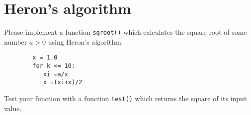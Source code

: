 \section{Heron's algorithm}
Please implement a function \verb|sqroot()| which calculates the square root of some number $a > 0$ using Heron's algorithm:
	\begin{verbatim}
		x = 1.0
		for k <= 10:
		   xi =a/x
		   x =(xi+x)/2
	\end{verbatim}
	Test your function with a function \verb|test()| which returns the square of its input value.